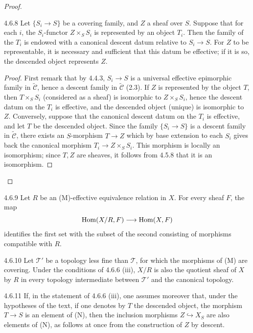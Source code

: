 \begin{proof}
\begin{proposition}{4.6.8}\label{IV.4.6.8}
Let \(\{S_i\to S\}\) be a covering family, and \(Z\) a sheaf
over \(S\). Suppose that for each \(i\), the \(S_i\)-functor
\(Z\times_S S_i\) is represented by an object \(T_i\).
Then the family of the \(T_i\) is endowed with a canonical
descent datum relative to \(S_i\to S\).
For \(Z\) to be representable, it is necessary and sufficient
that this datum be effective; if it is so, the
\og descended\fg{} object represents \(Z\).
\end{proposition}
\begin{proof}
First remark that by 4.4.3, \(S_i\to S\) is a universal
effective epimorphic family in \(\widetilde{\mathcal C}\),
hence a descent family in \(\widetilde{\mathcal C}\) (2.3).
If \(Z\) is represented by the object \(T\), then \(T\times_S S_i\)
(considered as a sheaf) is isomorphic to \(Z\times_S S_i\),
hence the descent datum on the \(T_i\) is effective, and
the descended object (unique) is isomorphic to \(Z\).
Conversely, suppose that the canonical descent datum on the
\(T_i\) is effective, and let \(T\) be the descended object.
Since the family \(\{S_i\to S\}\) is a descent family in
\(\widetilde{\mathcal C}\), there exists an \(S\)-morphism
\(T\to Z\) which by base extension to each \(S_i\) gives
back the canonical morphism \(T_i\to Z\times_S S_i\).
This morphism is locally an isomorphism; since \(T,Z\)
are sheaves, it follows from 4.5.8 that it is an isomorphism.
\end{proof}

\end{proof}
\begin{corollary}{4.6.9}\label{IV.4.6.9}
Let \(R\) be an (M)-effective equivalence relation in \(X\).
For every sheaf \(F\), the map
\[
\operatorname{Hom}(X/R,F)\longrightarrow\operatorname{Hom}(X,F)
\]
identifies the first set with the subset of the second consisting
of morphisms compatible with \(R\).
\end{corollary}
\begin{corollary}{4.6.10}\label{IV.4.6.10}
Let \(\mathcal T'\) be a topology less fine than \(\mathcal T\),
for which the morphisms of (M) are covering.
Under the conditions of 4.6.6 (iii), \(X/R\) is also the
quotient sheaf of \(X\) by \(R\) in every topology intermediate
between \(\mathcal T'\) and the canonical topology.
\end{corollary}
\begin{remark}{4.6.11}\label{IV.4.6.11}
If, in the statement of 4.6.6 (iii), one assumes moreover
that, under the hypotheses of the text, if one denotes by
\(T\) the descended object, the morphism \(T\to S\) is an
element of (N), then the inclusion morphisms \(Z\hookrightarrow X_S\)
are also elements of (N), as follows at once from the
construction of \(Z\) by descent.
\end{remark}
